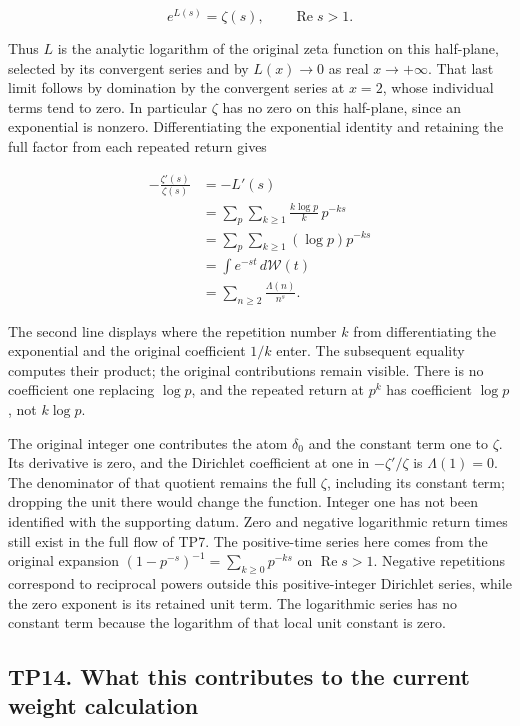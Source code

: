 \documentclass[
]{article}
\begin{document}
\[
\boxed{e^{L(s)}=\zeta(s),\qquad\operatorname{Re}s>1.}
\]

Thus \(L\) is the analytic logarithm of the original zeta function on
this half-plane, selected by its convergent series and by \(L(x)\to0\)
as real \(x\to+\infty\). That last limit follows by domination by the
convergent series at \(x=2\), whose individual terms tend to zero. In
particular \(\zeta\) has no zero on this half-plane, since an
exponential is nonzero. Differentiating the exponential identity and
retaining the full factor from each repeated return gives

\[
\begin{aligned}
-\frac{\zeta'(s)}{\zeta(s)}
&=-L'(s)\\
&=\sum_p\sum_{k\ge1}\frac{k\log p}{k}\,p^{-ks}\\
&=\sum_p\sum_{k\ge1}(\log p)p^{-ks}\\
&=\int e^{-st}\,d\mathcal W(t)\\
&=\sum_{n\ge2}\frac{\Lambda(n)}{n^s}.
\end{aligned}
\]

The second line displays where the repetition number \(k\) from
differentiating the exponential and the original coefficient \(1/k\)
enter. The subsequent equality computes their product; the original
contributions remain visible. There is no coefficient one replacing
\(\log p\), and the repeated return at \(p^k\) has coefficient
\(\log p\), not \(k\log p\).

The original integer one contributes the atom \(\delta_0\) and the
constant term one to \(\zeta\). Its derivative is zero, and the
Dirichlet coefficient at one in \(-\zeta'/\zeta\) is \(\Lambda(1)=0\).
The denominator of that quotient remains the full \(\zeta\), including
its constant term; dropping the unit there would change the function.
Integer one has not been identified with the supporting datum. Zero and
negative logarithmic return times still exist in the full flow of TP7.
The positive-time series here comes from the original expansion
\((1-p^{-s})^{-1}=\sum_{k\ge0}p^{-ks}\) on \(\operatorname{Re}s>1\).
Negative repetitions correspond to reciprocal powers outside this
positive-integer Dirichlet series, while the zero exponent is its
retained unit term. The logarithmic series has no constant term because
the logarithm of that local unit constant is zero.

\subsection{TP14. What this contributes to the current weight
calculation}\label{tp14.-what-this-contributes-to-the-current-weight-calculation}
\end{document}
